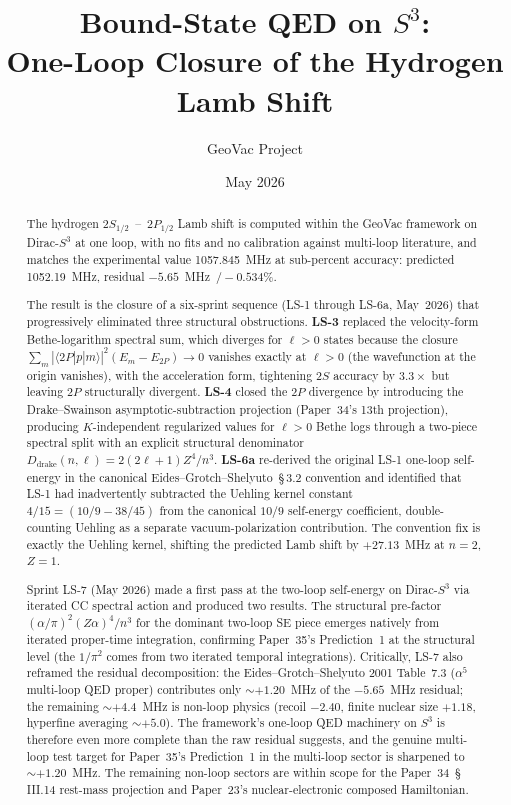 \documentclass[11pt]{article}
\title{Bound-State QED on $S^3$:\\
One-Loop Closure of the Hydrogen Lamb Shift}
\author{GeoVac Project}
\date{May 2026}
\begin{document}
\maketitle

\begin{abstract}
The hydrogen 2$S_{1/2}$~--~2$P_{1/2}$ Lamb shift is computed within
the GeoVac framework on Dirac-$S^3$ at one loop, with no fits and no
calibration against multi-loop literature, and matches the experimental
value 1057.845~MHz at sub-percent accuracy: predicted 1052.19~MHz,
residual $-5.65$~MHz~$/-0.534\%$.

The result is the closure of a six-sprint sequence (LS-1 through LS-6a,
May~2026) that progressively eliminated three structural obstructions.
\textbf{LS-3} replaced the velocity-form Bethe-logarithm spectral sum,
which diverges for $\ell > 0$ states because the closure
$\sum_m |\langle 2P|p|m\rangle|^2 (E_m - E_{2P}) \to 0$ vanishes
exactly at $\ell > 0$ (the wavefunction at the origin vanishes), with
the acceleration form, tightening 2$S$ accuracy by $3.3\times$ but
leaving 2$P$ structurally divergent.  \textbf{LS-4} closed the 2$P$
divergence by introducing the Drake--Swainson asymptotic-subtraction
projection (Paper~34's 13th projection), producing $K$-independent
regularized values for $\ell > 0$ Bethe logs through a two-piece
spectral split with an explicit structural denominator
$D_{\text{drake}}(n,\ell) = 2(2\ell+1)Z^4/n^3$.  \textbf{LS-6a}
re-derived the original LS-1 one-loop self-energy in the canonical
Eides--Grotch--Shelyuto~\S\,3.2 convention and identified that LS-1
had inadvertently subtracted the Uehling kernel constant
$4/15 = (10/9 - 38/45)$ from the canonical $10/9$ self-energy
coefficient, double-counting Uehling as a separate vacuum-polarization
contribution.  The convention fix is exactly the Uehling kernel,
shifting the predicted Lamb shift by $+27.13$~MHz at $n=2$, $Z=1$.

Sprint LS-7 (May 2026) made a first pass at the two-loop self-energy
on Dirac-$S^3$ via iterated CC spectral action and produced two
results.  The structural pre-factor
$(\alpha/\pi)^2 (Z\alpha)^4 / n^3$ for the dominant two-loop SE
piece emerges natively from iterated proper-time integration,
confirming Paper~35's Prediction~1 at the structural level (the
$1/\pi^2$ comes from two iterated temporal integrations).  Critically,
LS-7 also reframed the residual decomposition: the
Eides--Grotch--Shelyuto 2001 Table~7.3 ($\alpha^5$ multi-loop QED
proper) contributes only $\sim +1.20$~MHz of the $-5.65$~MHz
residual; the remaining $\sim +4.4$~MHz is non-loop physics (recoil
$-2.40$, finite nuclear size $+1.18$, hyperfine averaging
$\sim +5.0$).  The framework's one-loop QED machinery on $S^3$ is
therefore even more complete than the raw residual suggests, and the
genuine multi-loop test target for Paper~35's Prediction~1 in the
multi-loop sector is sharpened to $\sim +1.20$~MHz.  The remaining
non-loop sectors are within scope for the Paper~34~\S\,III.14
rest-mass projection and Paper~23's nuclear-electronic composed
Hamiltonian.


\end{abstract}
\end{document}
